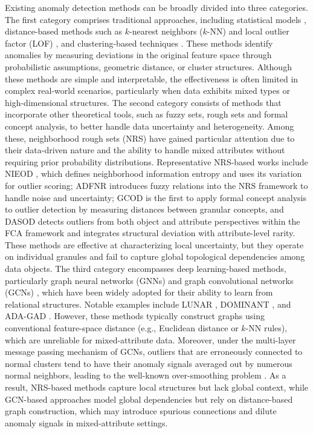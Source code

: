 \documentclass[lettersize,journal]{IEEEtran}
\begin{document}
Existing anomaly detection methods can be broadly divided into three categories. The first category
comprises traditional approaches, including statistical models \cite{ref5}, distance-based methods such
as $k$-nearest neighbors ($k$-NN) \cite{ref6} and local outlier factor (LOF) \cite{ref7}, and
clustering-based techniques \cite{ref8}. These methods identify anomalies by measuring deviations in the
original feature space through probabilistic assumptions, geometric distance, or cluster structures.
Although these methods are simple and interpretable, the effectiveness is often limited in complex
real-world scenarios, particularly when data exhibits mixed types or high-dimensional structures. The
second category consists of methods that incorporate other theoretical tools, such as fuzzy sets, rough
sets \cite{ref11} and formal concept analysis, to better handle data uncertainty and heterogeneity. Among
these, neighborhood rough sets (NRS) \cite{ref12,ref13} have gained particular attention due to their
data-driven nature and the ability to handle mixed attributes without requiring prior probability
distributions. Representative NRS-based works include NIEOD \cite{ref14}, which defines neighborhood
information entropy and uses its variation for outlier scoring; ADFNR \cite{ref16} introduces fuzzy
relations into the NRS framework to handle noise and uncertainty; GCOD \cite{ref19} is the first to
apply formal concept analysis to outlier detection by measuring distances between granular concepts, and
DASOD \cite{ref20} detects outliers from both object and attribute perspectives within the FCA framework
and integrates structural deviation with attribute-level rarity. These methods are effective at
characterizing local uncertainty, but they operate on individual granules and fail to capture global
topological dependencies among data objects. The third category encompasses deep learning-based methods,
particularly graph neural networks (GNNs) and graph convolutional networks (GCNs) \cite{ref21}, which
have been widely adopted for their ability to learn from relational structures. Notable examples include
LUNAR \cite{ref22}, DOMINANT \cite{ref23}, and ADA-GAD \cite{ref24}. However, these methods typically
construct graphs using conventional feature-space distance (e.g., Euclidean distance or $k$-NN rules),
which are unreliable for mixed-attribute data. Moreover, under the multi-layer message passing mechanism
of GCNs, outliers that are erroneously connected to normal clusters tend to have their anomaly signals
averaged out by numerous normal neighbors, leading to the well-known over-smoothing problem \cite{ref25}.
As a result, NRS-based methods capture local structures but lack global context, while GCN-based approaches
model global dependencies but rely on distance-based graph construction, which may introduce spurious
connections and dilute anomaly signals in mixed-attribute settings.
\end{document}
